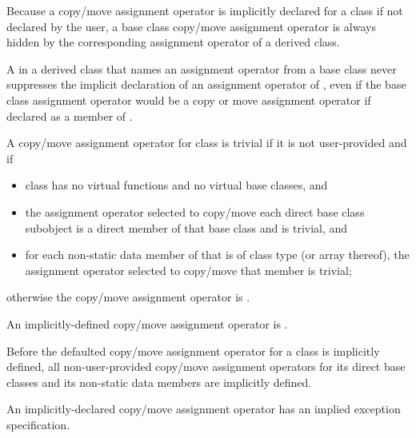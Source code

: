 \pnum
{}%
%
Because a copy/move assignment operator is implicitly declared for a class
if not declared by the user,
a base class copy/move assignment operator is always hidden
by the corresponding assignment operator of a derived class.
\begin{note}
A  in a derived class 
that names an assignment operator from a base class
never suppresses the implicit declaration of
an assignment operator of ,
even if the base class assignment operator would be
a copy or move assignment operator
if declared as a member of .
\end{note}

\pnum
{}%
%
A copy/move assignment operator for class
is
trivial
if it is not user-provided and if
\begin{itemize}
\item
class
has no virtual functions
and no virtual base classes, and

\item the assignment operator selected to copy/move each direct
base class subobject is a direct member of that base class and is trivial, and

\item
for each non-static data member of
that is of class type (or array thereof),
the assignment operator selected to copy/move that member is trivial;
\end{itemize}
%
otherwise the copy/move assignment operator is
.

\pnum
An implicitly-defined copy/move assignment operator is .

\pnum
Before the defaulted copy/move assignment operator for a class is
implicitly defined,
all non-user-provided copy/move assignment operators for
its direct base classes and
its non-static data members are implicitly defined.
\begin{note}
An implicitly-declared copy/move assignment operator has an
implied exception specification.
\end{note}


